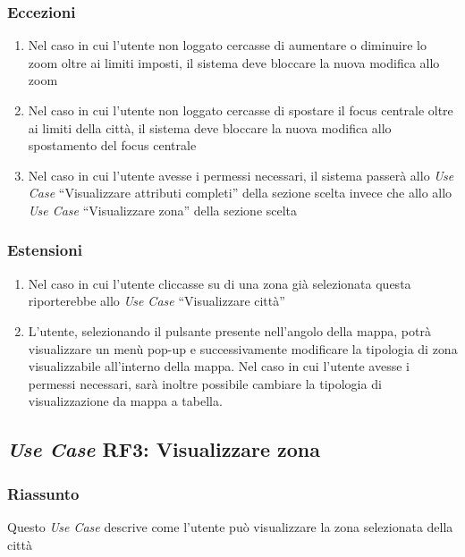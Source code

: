         \subsubsection{Eccezioni}
            \begin{enumerate}
                \item Nel caso in cui l'utente non loggato cercasse di aumentare o diminuire lo zoom oltre ai limiti imposti, il sistema deve bloccare la nuova modifica allo zoom
                \item Nel caso in cui l'utente non loggato cercasse di spostare il focus centrale oltre ai limiti della città, il sistema deve bloccare la nuova modifica allo spostamento del focus centrale
                \item Nel caso in cui l'utente avesse i permessi necessari, il sistema passerà allo \textit{Use Case} ``Visualizzare attributi completi'' della sezione scelta invece che allo allo \textit{Use Case} ``Visualizzare zona'' della sezione scelta
            \end{enumerate}
        \subsubsection{Estensioni}
            \begin{enumerate}
                \item Nel caso in cui l'utente cliccasse su di una zona già selezionata questa riporterebbe allo \textit{Use Case} ``Visualizzare città''
                \item L'utente, selezionando il pulsante presente nell'angolo della mappa, potrà visualizzare un menù pop-up e successivamente modificare la tipologia di zona visualizzabile all'interno della mappa.
                Nel caso in cui l'utente avesse i permessi necessari, sarà inoltre possibile cambiare la tipologia di visualizzazione da mappa a tabella.
            \end{enumerate}
    
    \subsection{\textit{Use Case} RF3: Visualizzare zona}
        \subsubsection{Riassunto}
            Questo \textit{Use Case} descrive come l'utente può visualizzare la zona selezionata della città
